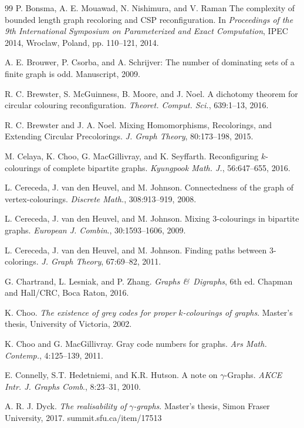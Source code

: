 \documentclass[12pt]{article}%
\begin{document}
\begin{thebibliography}{99}
P. Bonsma, A. E. Mouawad, N. Nishimura, and V. Raman The
complexity of bounded length graph recoloring and CSP reconfiguration. In
\emph{Proceedings of the 9th International Symposium on Parameterized and
Exact Computation}, IPEC 2014, Wroclaw, Poland, pp. 110--121, 2014.

A. E. Brouwer, P. Csorba, and A. Schrijver: The number of
dominating sets of a finite graph is odd. Manuscript, 2009.

R. C. Brewster, S. McGuinness, B. Moore, and J. Noel. A
dichotomy theorem for circular colouring reconfiguration.\emph{ Theoret.
Comput. Sci.}, 639:1--13, 2016.

R. C. Brewster and J. A. Noel. Mixing Homomorphisms,
Recolorings, and Extending Circular Precolorings. \emph{J. Graph Theory},
80:173--198, 2015.

M. Celaya, K. Choo, G. MacGillivray, and K. Seyffarth.
Reconfiguring $k$-colourings of complete bipartite graphs.\emph{ Kyungpook
Math. J.}, 56:647--655, 2016.

L. Cereceda, J. van den Heuvel, and M. Johnson.
Connectedness of the graph of vertex-colourings. \emph{Discrete Math.},
308:913--919, 2008.

L. Cereceda, J. van den Heuvel, and M. Johnson. Mixing
$3$-colourings in bipartite graphs. \emph{European J. Combin}., 30:1593--1606, 2009.

L. Cereceda, J. van den Heuvel, and M. Johnson. Finding
paths between $3$-colorings. \emph{J. Graph Theory}, 67:69--82, 2011.

G. Chartrand, L. Lesniak, and P. Zhang. \emph{Graphs
\&\ Digraphs},\emph{ }6th ed. Chapman and Hall/CRC, Boca Raton, 2016.

K. Choo. \emph{The existence of grey codes for
proper }$k$\emph{-colourings of graphs}. Master's thesis, University of
Victoria, 2002.

K. Choo and G. MacGillivray. Gray code numbers for
graphs. \emph{Ars Math. Contemp.}, 4:125--139, 2011.

E. Connelly, S.T. Hedetniemi, and K.R. Hutson. A note on
$\gamma$-Graphs. \emph{AKCE Intr. J. Graphs Comb}., 8:23--31, 2010.

A. R. J. Dyck. \emph{The realisability of }$\gamma
$\emph{-graphs}. Master's thesis, Simon Fraser University, 2017. summit.sfu.ca/item/17513


\end{thebibliography}
\end{document}

